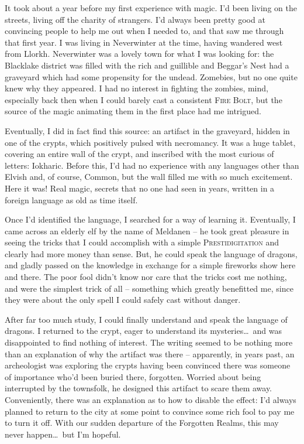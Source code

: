 It took about a year before my first experience with magic. I'd been living on the streets, living off the charity of strangers. I'd always been pretty good at convincing people to help me out when I needed to, and that saw me through that first year. I was living in Neverwinter at the time, having wandered west from Llorkh. Neverwinter was a lovely town for what I was looking for: the Blacklake district was filled with the rich and guillible and Beggar's Nest had a graveyard which had some propensity for the undead. Zomebies, but no one quite knew why they appeared. I had no interest in fighting the zombies, mind, especially back then when I could barely cast a consistent \textsc{Fire Bolt}, but the source of the magic animating them in the first place had me intrigued.

Eventually, I did in fact find this source: an artifact in the graveyard, hidden in one of the crypts, which positively pulsed with necromancy. It was a huge tablet, covering an entire wall of the crypt, and inscribed with the most curious of letters: Iokharic. Before this, I'd had no experience with any languages other than Elvish and, of course, Common, but the wall filled me with so much excitement. Here it was! Real magic, secrets that no one had seen in years, written in a foreign language as old as time itself.

Once I'd identified the language, I searched for a way of learning it. Eventually, I came across an elderly elf by the name of Meldanen -- he took great pleasure in seeing the tricks that I could accomplish with a simple \textsc{Prestidigitation} and clearly had more money than sense. But, he could speak the language of dragons, and gladly passed on the knowledge in exchange for a simple fireworks show here and there. The poor fool didn't know nor care that the tricks cost me nothing, and were the simplest trick of all -- something which greatly benefitted me, since they were about the only spell I could safely cast without danger.

After far too much study, I could finally understand and speak the language of dragons. I returned to the crypt, eager to understand its mysteries\dots\ and was disappointed to find nothing of interest. The writing seemed to be nothing more than an explanation of why the artifact was there -- apparently, in years past, an archeologist was exploring the crypts having been convinced there was someone of importance who'd been buried there, forgotten. Worried about being interrupted by the townsfolk, he designed this artifact to scare them away. Conveniently, there was an explanation as to how to disable the effect: I'd always planned to return to the city at some point to convince some rich fool to pay me to turn it off. With our sudden departure of the Forgotten Realms, this may never happen\dots\ but I'm hopeful.

